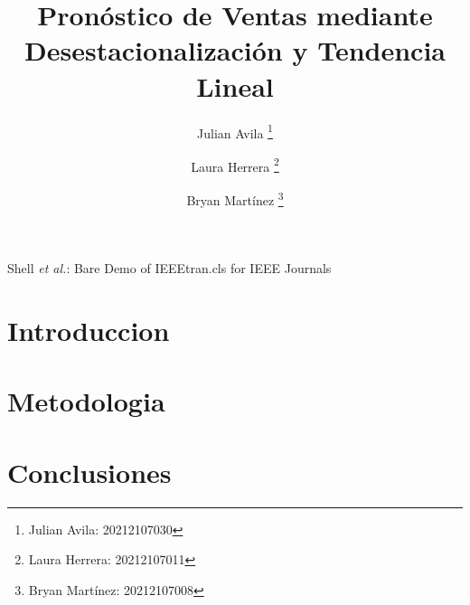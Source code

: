 \documentclass[journal, table]{IEEEtran}
\begin{document}
\title{Pronóstico de Ventas mediante Desestacionalización y Tendencia Lineal}

\author[*]{Julian Avila
  \thanks{Julian Avila: 20212107030}}
\author[*]{Laura Herrera
  \thanks{Laura Herrera: 20212107011}}
\author[*]{Bryan Martínez
  \thanks{Bryan Martínez: 20212107008}}


\markboth{}
{Shell \MakeLowercase{\textit{et al.}}: Bare Demo of IEEEtran.cls for IEEE Journals}

\maketitle

\section{Introduccion}


\section{Metodologia}


\section{Conclusiones}


\printbibliography
\end{document}
